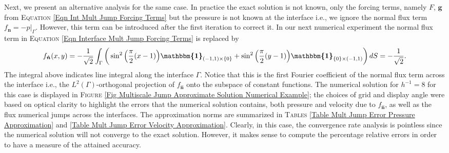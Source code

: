 \documentclass[3p]{elsarticle}
\def\g{\mathbf g}
\def\R{\bm{\mathbbm{R} } }
\def\flux{f_{\bm{\hat{n}} } }
\def\stress{f_{\Sigma } }
\def\ind{\boldsymbol{\mathbbm{1}}}
\begin{document}
\begin{example}
Next, we present an alternative analysis for the same case. In practice the exact solution is not known, only the forcing terms, namely $ F $, $ \g $ from \textsc{Equation} \eqref{Eqn Int Mult Jump Forcing Terms} but the pressure is not known at the interface i.e., we ignore the normal flux term $ \flux = - p\big\vert_{\Gamma} $. However, this term can be introduced after the first iteration to correct it. In our next numerical experiment the normal flux term in \textsc{Equation} \ref{Eqn Interface Mult Jump Forcing Terms} is replaced by
%
\begin{equation}\label{Eqn Interface Mult Jump Error Forcing Terms}
%
\flux (x,y) = - \frac{1}{\sqrt{2} } \int_{\Gamma}
\bigg(\sin^{2}\Big(\frac{\pi}{2}(x - 1)\Big)\ind_{ (-1,1)\times\{0\} }  
+  \sin^{2}\Big(\frac{\pi}{2}(y - 1)\Big)\ind_{\{0\} \times (-1,1)}\bigg) \,dS\\
%
= - \frac{1}{\sqrt{2} }.
%
\end{equation}
%
The integral above indicates line integral along the interface $ \Gamma$. Notice that this is the first Fourier coefficient of the normal flux term across the interface i.e., the $ L^{2}(\Gamma) $-orthogonal projection of $ \flux $ onto the subspace of constant functions. The numerical solution for $ h^{-1} = 8 $ for this case is displayed in \textsc{Figure} \ref{Fig Multiscale Jump Approximate Solution Numerical Example}; the choices of grid and display angle were based on optical clarity to highlight the errors that the numerical solution contains, both pressure and velocity due to $ \flux $, as well as the flux numerical jumps across the interfaces. The approximation norms are summarized in \textsc{Tables} \ref{Table Mult Jump Error Pressure Approximation} and \ref{Table Mult Jump Error Velocity Approximation}. Clearly, in this case, the convergence rate analysis is pointless since the numerical solution will not converge to the exact solution. However, it makes sense to compute the percentage relative errors in order to have a measure of the attained accuracy.

\end{example}
\end{document}
